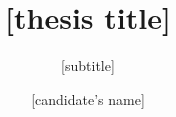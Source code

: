 \documentclass[11pt]{aucklandthesis}
\begin{document}
%
%
%

\title{[thesis title]}
\subtitle{[subtitle]}
\author{[candidate's name]}
\degreesought{[degree]} 
\degreediscipline{[discipline]}
\degreecompletionyear{[year]}

\maketitle





%

%
%
%
%

% 
% 

%
%
%
\cleardoublepage %
\setcounter{page}{1} %
%  

\end{document}
